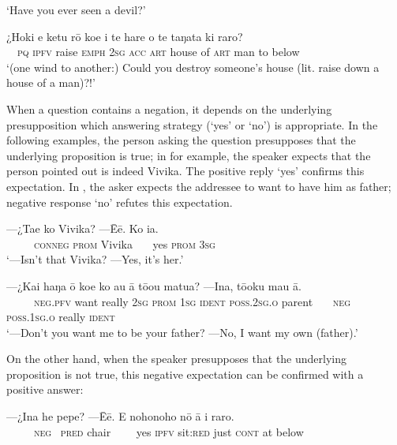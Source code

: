 \glt 
‘Have you ever seen a devil?’ \textstyleExampleref{[R215.029]} 
\z

\ea\label{ex:10.24}
\gll ¿Hoki e ketu rō koe i te hare o te taŋata ki raro? \\
~~\textsc{pq} \textsc{ipfv} raise \textsc{emph} \textsc{2sg} \textsc{acc} \textsc{art} house of \textsc{art} man to below \\

\glt 
‘(one wind to another:) Could you destroy someone’s house (lit. raise down a house of a man)?!’ \textstyleExampleref{[R314.121]}\textstyleExampleref{} 
\z

When a question contains a negation, it depends on the underlying presupposition which answering strategy (‘yes’ or ‘no’) is appropriate. In the following examples, the person asking the question presupposes that the underlying proposition is true; in  for example, the speaker expects that the person pointed out is indeed Vivika. The positive reply ‘yes’ confirms this expectation. In , the asker expects the addressee to want to have him as father; negative response ‘no’ refutes this expectation.

\ea\label{ex:10.25}
\gll —¿Ta{\ꞌ}e ko Vivika? —{\ꞌ}Ēē. Ko ia. \\
~~~~~\textsc{conneg} \textsc{prom} Vivika ~~~yes \textsc{prom} \textsc{3sg} \\

\glt 
‘—Isn’t that Vivika? —Yes, it’s her.’ \textstyleExampleref{[R415.947]} 
\z

\ea\label{ex:10.26}
\gll —¿Kai haŋa {\ꞌ}ō koe ko au {\ꞌ}ā tō{\ꞌ}ou matu{\ꞌ}a?  —{\ꞌ}Ina, tō{\ꞌ}oku mau {\ꞌ}ā.\\
~~~~~\textsc{neg.pfv} want really \textsc{2sg} \textsc{prom} \textsc{1sg} \textsc{ident} \textsc{poss.2sg.o} parent   ~~~\textsc{neg}~ \textsc{poss.1sg.o} really \textsc{ident}\\

\glt
‘—Don’t you want me to be your father? —No, I want my own (father).’ \textstyleExampleref{[Mtx-7-26.036–037]}
\z

On the other hand, when the speaker presupposes that the underlying proposition is not true, this negative expectation can be confirmed with a positive answer:

\ea\label{ex:10.27}
\gll —¿{\ꞌ}Ina he pepe? —{\ꞌ}Ēē. E nohonoho nō {\ꞌ}ā {\ꞌ}i raro. \\
~~~~~\textsc{neg~} \textsc{pred} chair ~~~~yes \textsc{ipfv} sit:\textsc{red} just \textsc{cont} at below \\


